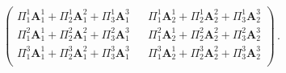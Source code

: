 \documentclass[a4paper,11pt]{article}
\begin{document}
\begin{equation}
\begin{split}
\begin{pmatrix}
      \Pi^1_1 \mathbf{A}^1_1 + \Pi^1_2 \mathbf{A}^2_1 + \Pi^1_3 \mathbf{A}^3_1 &&
      \Pi^1_1 \mathbf{A}^1_2 + \Pi^1_2 \mathbf{A}^2_2 + \Pi^1_3 \mathbf{A}^3_2 \\
      \Pi^2_1 \mathbf{A}^1_1 + \Pi^2_2 \mathbf{A}^2_1 + \Pi^2_3 \mathbf{A}^3_1 &&
      \Pi^2_1 \mathbf{A}^1_2 + \Pi^2_2 \mathbf{A}^2_2 + \Pi^2_3 \mathbf{A}^3_2 \\
      \Pi^3_1 \mathbf{A}^1_1 + \Pi^3_2 \mathbf{A}^2_1 + \Pi^3_3 \mathbf{A}^3_1 &&
      \Pi^3_1 \mathbf{A}^1_2 + \Pi^3_2 \mathbf{A}^2_2 + \Pi^3_3 \mathbf{A}^3_2 \\
    \end{pmatrix}\,.
  \end{split}
\end{equation}
\end{document}
